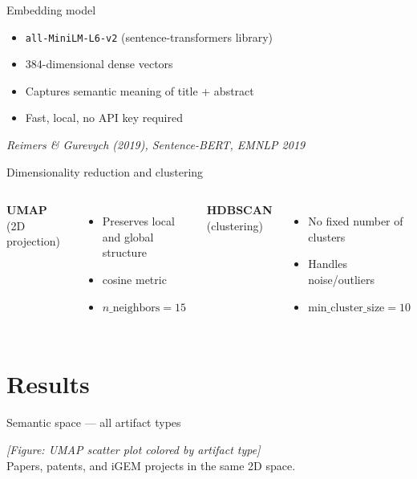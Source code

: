 \documentclass[aspectratio=169, 12pt]{beamer}
\begin{document}
\begin{frame}{Embedding model}
  \begin{itemize}
    \item \texttt{all-MiniLM-L6-v2} (sentence-transformers library)
    \item 384-dimensional dense vectors
    \item Captures semantic meaning of title + abstract
    \item Fast, local, no API key required
  \end{itemize}

  \vspace{1em}
  \textit{Reimers \& Gurevych (2019), Sentence-BERT, EMNLP 2019}
\end{frame}

\begin{frame}{Dimensionality reduction and clustering}
  \begin{columns}
    \textbf{UMAP} (2D projection)
    \begin{itemize}
      \item Preserves local and global structure
      \item cosine metric
      \item $n\_\text{neighbors} = 15$
    \end{itemize}

    \textbf{HDBSCAN} (clustering)
    \begin{itemize}
      \item No fixed number of clusters
      \item Handles noise/outliers
      \item $\text{min\_cluster\_size} = 10$
    \end{itemize}
  \end{columns}
\end{frame}

\section{Results}

\begin{frame}{Semantic space — all artifact types}
  \begin{center}
    \textit{[Figure: UMAP scatter plot colored by artifact type]}\\
    \vspace{1em}
    \small Papers, patents, and iGEM projects in the same 2D space.
  \end{center}
\end{frame}
\end{document}
